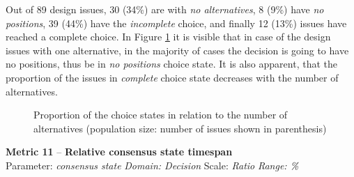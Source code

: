 \documentclass[article]{elsarticle}
\begin{document}
Out of 89 design issues, 30 (34\%) are with \emph{no alternatives}, 8 (9\%) have \emph{no positions}, 39 (44\%) have the \emph{incomplete} choice, and finally 12 (13\%) issues have reached a complete choice. In Figure \ref{fig:M10} it is visible that in case of the design issues with one alternative, in the majority of cases the decision is going to have no positions, thus be in \emph{no positions} choice state. It is also apparent, that the proportion of the issues in \emph{complete} choice state decreases with the number of alternatives. 
\begin{figure}
  \begin{center}

  \caption{Proportion of the choice states in relation to the number of alternatives (population size: number of issues shown in parenthesis)}
  \label{fig:M10}
  \end{center}
\end{figure}

\vspace{1em}
\noindent
\textbf{Metric 11} -- \textbf{Relative consensus state timespan}\\
Parameter: \emph{consensus state} \emph{Domain: Decision} Scale: \emph{Ratio} \emph{Range: \%}
\end{document}

